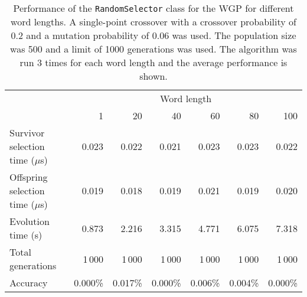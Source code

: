 \begin{table}[ht!]
  \centering
  \begin{tabular}{|l|r|r|r|r|r|r|}
    \hline
    	& \multicolumn{6}{c|}{Word length}	\\\cline{2-7}
    	& 1	& 20	& 40	& 60	& 80	& 100	\\\hline
    
    Survivor selection time (\(\mu\)s)	& 0.023	& 0.022	& 0.021	& 0.023	& 0.023	& 0.022	\\\hline
    
    Offspring selection time (\(\mu\)s)	& 0.019	& 0.018	& 0.019	& 0.021	& 0.019	& 0.020	\\\hline
    
    Evolution time (s)	& 0.873	& 2.216	& 3.315	& 4.771	& 6.075	& 7.318	\\\hline
    
    Total generations	& 1\,000	& 1\,000	& 1\,000	& 1\,000	& 1\,000	& 1\,000	\\\hline
    
    Accuracy	& 0.000\%	& 0.017\%	& 0.000\%	& 0.006\%	& 0.004\%	& 0.000\%	\\\hline
  \end{tabular}
  \caption{Performance of the \texttt{RandomSelector} class for the WGP for different word lengths. A single-point crossover with a crossover probability of 0.2 and a mutation probability of 0.06 was used. The population size was 500 and a limit of 1000 generations was used. The algorithm was run 3 times for each word length and the average performance is shown.}
  \label{tab:keen:operators:selection:random}
\end{table}